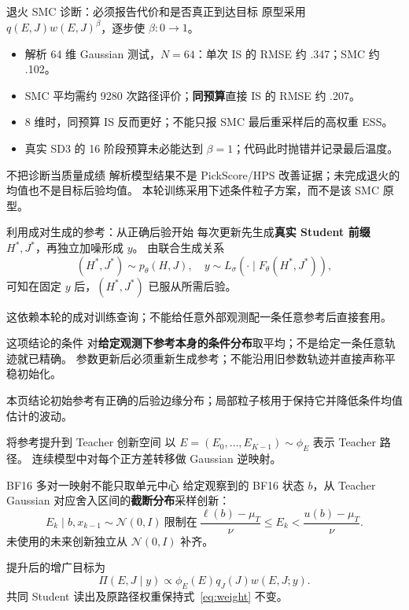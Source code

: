 \documentclass[10pt,aspectratio=169]{beamer}
\newcommand{\N}{\mathcal N}
\newcommand{\takeaway}[1]{\begin{exampleblock}{本页结论}\small #1\end{exampleblock}}
\begin{document}
\begin{frame}{退火 SMC 诊断：必须报告代价和是否真正到达目标}
\small
原型采用 $q(E,J)w(E,J)^\beta$，逐步使 $\beta:0\to1$。
\begin{itemize}\itemsep5pt
\item 解析 64 维 Gaussian 测试，$N=64$：单次 IS 的 RMSE 约 .347；SMC 约 .102。
\item SMC 平均需约 9280 次路径评价；\textbf{同预算}直接 IS 的 RMSE 约 .207。
\item 8 维时，同预算 IS 反而更好；不能只报 SMC 最后重采样后的高权重 ESS。
\item 真实 SD3 的 16 阶段预算未必能达到 $\beta=1$；代码此时抛错并记录最后温度。
\end{itemize}
\begin{alertblock}{不把诊断当质量成绩}
解析模型结果不是 PickScore/HPS 改善证据；未完成退火的均值也不是目标后验均值。
本轮训练采用下述条件粒子方案，而不是该 SMC 原型。
\end{alertblock}
\end{frame}

\begin{frame}{利用成对生成的参考：从正确后验开始}
\small
每次更新先生成\textbf{真实 Student 前缀} $H^*,J^*$，再独立加噪形成 $y$。
由联合生成关系
\begin{equation}
(H^*,J^*)\sim p_\theta(H,J),\quad y\sim L_\sigma(\cdot\mid F_\theta(H^*,J^*)),
\end{equation}
可知在固定 $y$ 后，$(H^*,J^*)$ 已服从所需后验。\par
这依赖本轮的成对训练查询；不能给任意外部观测配一条任意参考后直接套用。
\begin{block}{这项结论的条件}
对\textbf{给定观测下参考本身的条件分布}取平均；不是给定一条任意轨迹就已精确。
参数更新后必须重新生成参考；不能沿用旧参数轨迹并直接声称平稳初始化。
\end{block}
\takeaway{初始参考有正确的后验边缘分布；局部粒子核用于保持它并降低条件均值估计的波动。}
\end{frame}

\begin{frame}{将参考提升到 Teacher 创新空间}
\small
以 $E=(E_0,\ldots,E_{K-1})\sim\phi_E$ 表示 Teacher 路径。
连续模型中对每个正方差转移做 Gaussian 逆映射。
\begin{block}{BF16 多对一映射不能只取单元中心}
给定观察到的 BF16 状态 $b$，从 Teacher Gaussian 对应舍入区间的\textbf{截断分布}采样创新：
\begin{equation}
E_k\mid b,x_{k-1}\sim\N(0,I)
\ \text{限制在}\ \frac{\ell(b)-\mu_T}{\nu}\leq E_k<\frac{u(b)-\mu_T}{\nu}.
\end{equation}
未使用的未来创新独立从 $\N(0,I)$ 补齐。
\end{block}
提升后的增广目标为
\begin{equation}\label{eq:extended}
\Pi(E,J\mid y)\propto\phi_E(E)q_J(J)w(E,J;y).
\end{equation}
共同 Student 读出及原路径权重保持式~\eqref{eq:weight} 不变。
\end{frame}
\end{document}
